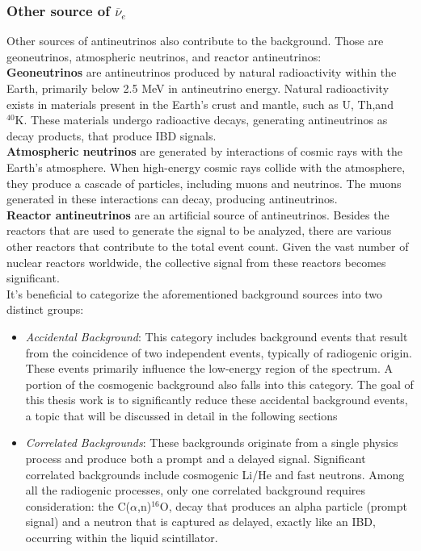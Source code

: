 \subsubsection*{Other source of  $\overline{\nu}_e$}

Other sources of antineutrinos also contribute to the background. Those are geoneutrinos, atmospheric neutrinos, and reactor antineutrinos:\\

\textbf{Geoneutrinos} are antineutrinos produced by natural radioactivity within the Earth, primarily below 2.5 MeV in antineutrino energy. Natural radioactivity exists in materials present in the Earth's crust and mantle, such as $\mathrm{U}$, $\mathrm{Th}$,and $^{40}\mathrm{K}$. These materials undergo radioactive decays, generating antineutrinos as decay products, that produce IBD signals.\\

\textbf{Atmospheric neutrinos} are generated by interactions of cosmic rays with the Earth's atmosphere. When high-energy cosmic rays collide with the atmosphere, they produce a cascade of particles, including muons and neutrinos. The muons generated in these interactions can decay, producing antineutrinos.\\

\textbf{Reactor antineutrinos} are an artificial source of antineutrinos. Besides the reactors that are used to generate the signal to be analyzed, there are various other reactors that contribute to the total event count. Given the vast number of nuclear reactors worldwide, the collective signal from these reactors becomes significant.\\




It's beneficial to categorize the aforementioned background sources into two distinct groups:

\begin{itemize}
	\item \textit{Accidental Background}: This category includes background events that result from the coincidence of two independent events, typically of radiogenic origin. These events primarily influence the low-energy region of the spectrum. A portion of the cosmogenic background also falls into this category. The goal of this thesis work is to significantly reduce these accidental background events, a topic that will be discussed in detail in the following sections
	\item \textit{Correlated Backgrounds}: These backgrounds originate from a single physics process and produce both a prompt and a delayed signal. Significant correlated backgrounds include cosmogenic Li/He and fast neutrons. Among all the radiogenic processes, only one correlated background requires consideration: the $\mathrm{C}$($\alpha$,n)$^{16}\mathrm{O}$, decay that produces an alpha particle (prompt signal) and a neutron that is captured as delayed, exactly like an IBD, occurring within the liquid scintillator.
\end{itemize}
 





